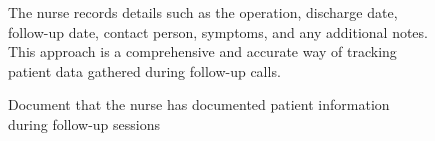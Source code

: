\documentclass[12pt,oneside,openright,a4paper]{cpe-english-project}
\begin{document}
      \begin{figure}
        \centering
        \caption{Document that the nurse has documented patient information during follow-up sessions}\label{fig:Interview_4}
        \begin{flushleft}
          \qquad The nurse records details such as the operation, discharge date, follow-up date, contact person, symptoms, and any additional notes. This approach is a comprehensive and accurate way of tracking patient data gathered during follow-up calls. \par
        \end{flushleft}
      \end{figure}



\makeatletter
\g@addto@macro{\UrlBreaks}{\UrlOrds}
\makeatother
% 



      
\end{document}
